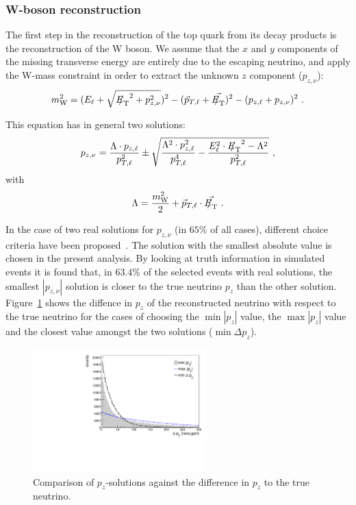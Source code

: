 \subsubsection{W-boson reconstruction}
\label{mlbnu}

The first step in the reconstruction of the top quark from its decay products is the reconstruction of the W boson. 
We assume that the $x$ and $y$ components of the missing transverse energy are entirely due to the escaping neutrino, 
and apply the W-mass constraint in order to extract the unknown $z$ component ($p_{z,\nu}$):
\begin{equation}
\label{eq:wconstraint}
m_{\mathrm{\rm W}}^2 = (E_{\ell} + \sqrt{{{E\!\!\!/}_{\mathrm{T}}}^2 + p_{z,\nu}^2})^2 - (\vec p_{T,\ell}+\vec{{E\!\!\!/}_{\mathrm{T}}})^2 - (p_{z,\ell}+p_{z,\nu})^2 ~.
\end{equation}

This equation has in general two solutions:
\begin{equation}
\label{eq:solutions}
p_{z,\nu} = \frac{\Lambda \cdot p_{z,\ell}}{p_{T,\ell}^2} 
\pm \sqrt{
\frac{\Lambda^2\cdot p^2_{z,\ell}}{p_{T,\ell}^4} 
- \frac{E^2_{\ell}\cdot {\ensuremath{{E\!\!\!/}_{\mathrm{T}}}}^2 - \Lambda^2}{p_{T,\ell}^2}
}~,
\end{equation}
with
\begin{equation}
\label{eq:muW}
\Lambda = \frac{m_{\mathrm{\rm W}}^2}{2} + \vec p_{T,\ell}\cdot \vec {{E\!\!\!/}_{\mathrm{T}}}~.
\end{equation}

In the case of two real solutions for $p_{z,\nu}$ (in $65\%$ of all cases), different choice criteria have been proposed~\cite{Abazov:2009ii, Aaltonen:2009jj}. The solution with the smallest absolute value is chosen in the present analysis. By looking at truth information in simulated events it is found that, in $63.4\%$ of the selected events with real solutions, the smallest $|p_{z,\nu}|$ solution is closer to the true neutrino $p_{z}$ than the other solution. Figure~\ref{fig:pz_solution} shows the diffence in $p_z$ of the reconstructed neutrino with respect to the true neutrino for the cases of choosing the $\min |p_z|$ value, the $\max |p_z|$ value and the closest value amongst the two solutions ($\min \Delta p_{z}$).

\begin{figure}[hbpt]
\begin{center}
\includegraphics[width=0.6\textwidth]{figures/pz_solution.pdf}
\caption{\label{fig:pz_solution}Comparison of $p_{z}$-solutions against the difference in $p_{z}$ to the true neutrino.}
\end{center}
\end{figure}

